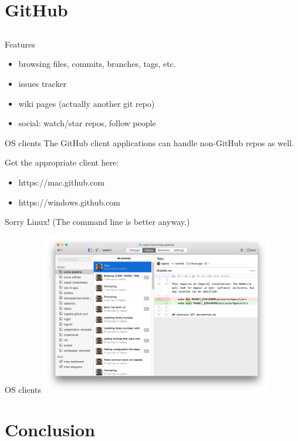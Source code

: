 \documentclass{beamer}
\begin{document}
\section{GitHub}
\subsection*{}

\begin{frame}{Features}
  \begin{itemize}
    \item browsing files, commits, branches, tags, etc.
    \item issues tracker
    \item wiki pages (actually another git repo)
    \item social: watch/star repos, follow people
  \end{itemize}
\end{frame}

\begin{frame}{OS clients}
The GitHub client applications can handle non-GitHub repos as well.

\vspace{1em}

Get the appropriate client here:
  \begin{itemize}
    \item https://mac.github.com
    \item https://windows.github.com
  \end{itemize}
Sorry Linux! (The command line is better anyway.)
\end{frame}

\begin{frame}{OS clients}
  \includegraphics[width=4in]{mac-client.png}
\end{frame}


\section{Conclusion}
\end{document}
